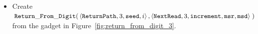 \begin{itemize}
    \item Create
    $\begin{aligned}[t]
        {\tt Return\_From\_Digit}(&\left\langle {\tt ReturnPath}, 3, {\tt seed}, i                        \right\rangle,
                          \left\langle {\tt NextRead},   3, {\tt increment}, {\tt msr}, {\tt msd}\right\rangle \;)
    \end{aligned}$\\from the gadget in Figure~\ref{fig:return_from_digit_3}.
\end{itemize}




\begin{figure}[H]
    \centering
    \hfill%

\end{figure}
